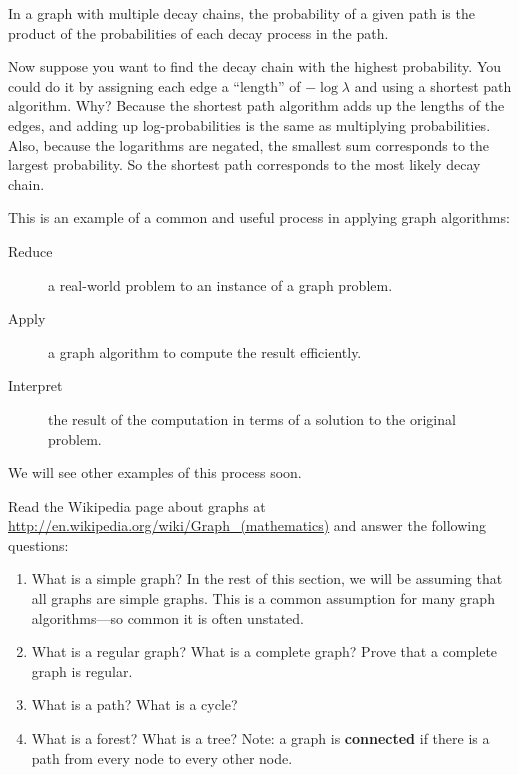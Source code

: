 \documentclass[10pt]{book}
\begin{document}
In a graph with multiple decay chains, the probability of a
given path is the product of the probabilities of each decay
process in the path.

Now suppose you want to find the decay chain with the highest
probability.  You could do it by assigning each edge a ``length'' of
$-\log \lambda$ and using a shortest path algorithm.  Why?  Because the
shortest path algorithm adds up the lengths of the edges, and adding
up log-probabilities is the same as multiplying probabilities.  Also,
because the logarithms are negated, the smallest sum corresponds to
the largest probability.  So the shortest path corresponds to the most
likely decay chain.

This is an example of a common and useful process in applying
graph algorithms:

\begin{description}

\item[Reduce] a real-world problem to an instance of a graph
problem.

\item[Apply] a graph algorithm to compute the result efficiently.

\item[Interpret] the result of the computation in terms of a
solution to the original problem.

\end{description}

We will see other examples of this process soon.

\begin{exercise}

Read the Wikipedia page about graphs at
\url{http://en.wikipedia.org/wiki/Graph_(mathematics)}
and answer the following questions:

\begin{enumerate}

\item What is a simple graph?  In the rest of this section,
we will be assuming that all graphs are simple graphs.  This
is a common assumption for many graph algorithms---so
common it is often unstated.

\item What is a regular graph?  What is a complete graph?  Prove
that a complete graph is regular.

\item What is a path?  What is a cycle?

\item What is a forest?  What is a tree?  Note: a graph
is {\bf connected} if there is a path from every node to
every other node.

\end{enumerate}

\end{exercise}
\end{document}
